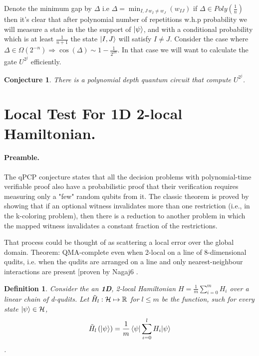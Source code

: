 \documentclass{article}
\newtheorem{definition}[theorem]{Definition}
\newtheorem{conjecture}[theorem]{Conjecture}
\begin{document}
Denote the minimum gap by \( \Delta \) i.e \( \Delta = \min_{I,J \ w_{I} \neq w_{J}}{\left( w_{IJ} \right)} \) if \( \Delta \in Poly\left( \frac{1}{n}\right) \) then it's clear that after polynomial number of repetitions w.h.p probability we will measure a state in the the support of \( \ket{\psi} \), and with a conditional probability which is at least \(\frac{1}{n+1} \) the state \( \ket{I,J} \) will satisfy \( I \neq J \). Consider the case where \( \Delta \in \Omega\left( 2^{-n} \right) \Rightarrow \cos\left( \Delta \right) \sim 1 - \frac{1}{2^{2n}}\). In that case we will want to calculate the gate \(U^{2^{j}}\) efficiently.    

\begin{conjecture}
There is a polynomial depth quantum circuit that compute \( U^{2^{j}} \).   
\end{conjecture}


\section{Local Test For 1D 2-local Hamiltonian.}

\paragraph{Preamble.} The qPCP conjecture states that all the decision problems with polynomial-time verifiable proof also have a probabilistic proof that their verification requires measuring only a "few" random qubits from it. The classic theorem is proved by showing that if an optional witness invalidates more than one restriction (i.e., in the k-coloring problem), then there is a reduction to another problem in which the mapped witness invalidates a constant fraction of the restrictions. 

That process could be thought of as scattering a local error over the global domain.
Theorem: QMA-complete even when 2-local on a line of 8-dimensional qudits, i.e. when the
qudits are arranged on a line and only nearest-neighbour interactions are present [proven by Nagaj6 \cite{hallgren2013local}.

\begin{definition} Consider the an \textbf{1D}, 2-local Hamiltonian \(H = \frac{1}{m}\sum^{m}_{i=0}{H_i}\) over a linear chain of d-qudits.   Let \( \tilde{H}_{l}:\mathcal{H} \mapsto \mathbb{R} \) for 
\( l \le m \) be the function, such for every state \( \ket{\psi} \in \mathcal{H} \), \begin{equation*}
    \tilde{H}_{l}\left(\ket{\psi}\right) = \frac{1}{m}\braket{\psi|\sum^{l}_{i=0}{H_i}|\psi} 
\end{equation*}  . 
\end{definition}
\end{document}

